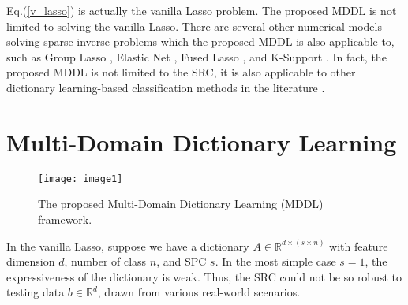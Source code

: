 \documentclass{article}
\begin{document}

Eq.(\ref{v_lasso}) is actually the vanilla Lasso problem. The proposed MDDL is not limited to solving the vanilla Lasso. There are several other numerical models solving sparse inverse problems which the proposed MDDL is also applicable to, such as Group Lasso \cite{yuan2006model}, Elastic Net \cite{zou2005regularization}, Fused Lasso \cite{tibshirani2005sparsity}, and K-Support \cite{lai2014efficient}. In fact, the proposed MDDL is not limited to the SRC, it is also applicable to other dictionary learning-based classification methods in the literature \cite{zhang2011iccv} \cite{yang2011cvpr} \cite{deng2012extended} \cite{cai2016cvpr} \cite{wu2016occlusion} \cite{gao2017semi} \cite{tang2018structured}.

\section{Multi-Domain Dictionary Learning}
\label{sec:method}

\begin{figure*}[!htb]
  \centerline{\texttt{[image: image1]}}
  \caption{The proposed Multi-Domain Dictionary Learning (MDDL) framework.}
\end{figure*}
%
In the vanilla Lasso, suppose we have a dictionary $A \in \mathbb{R}^{d \times (s \times n)}$ with feature dimension $d$, number of class $n$, and SPC $s$. In the most simple case $s=1$, the expressiveness of the dictionary is weak. Thus, the SRC could not be so robust to testing data $b \in \mathbb{R}^{d}$, drawn from various real-world scenarios.
\end{document}
